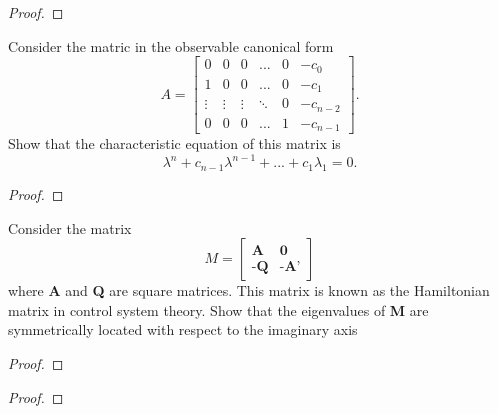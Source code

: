 \documentclass[conference,12pt,onecolumn,compsoc]{IEEEtran}
\begin{document}
\begin{proof}

\end{proof}

\begin{exercise}
Consider the matric in the observable canonical form
\begin{equation}
A=\begin{bmatrix} 0 & 0 & 0 & ... & 0 & -c_0 \\ 
1 & 0 & 0 & ... & 0 & -c_1 \\
\vdots & \vdots & \vdots & \ddots & 0 & -c_{n-2} \\
0 & 0 & 0 & ... & 1 & -c_{n-1}  \end{bmatrix}.
\nonumber
\end{equation}
Show that the characteristic equation of this matrix is
\begin{equation}
\lambda^n+c_{n-1}\lambda^{n-1}+...+c_1\lambda_1=0.
\nonumber
\end{equation}
\end{exercise}

\begin{proof}

\end{proof}

\begin{exercise}
Consider the matrix
\begin{equation}
M=\begin{bmatrix} \textbf{A} & \textbf{0} \\ 
\textbf{-Q} & \textbf{-A'}  \end{bmatrix}
\nonumber
\end{equation}
where \textbf{A} and \textbf{Q} are square matrices. This matrix is known as the Hamiltonian matrix in control system theory. Show that the eigenvalues of \textbf{M} are symmetrically located with respect to the imaginary axis
\end{exercise}
\begin{proof}

\end{proof}

\begin{exercise}

\end{exercise}
\begin{proof}

\end{proof}
\end{document}
